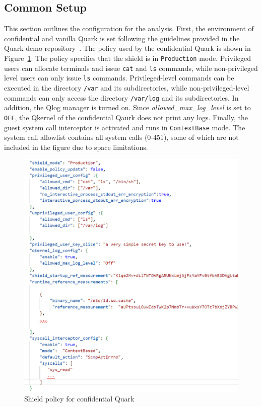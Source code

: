 \subsection{Common Setup}
\label{sec:eva_qualitativ_setup}

This section outlines the configuration for the analysis. First, the environment of confidential and vanilla Quark is set following the guidelines provided in the Quark demo repository~\cite*{Qaurk_Demo_for_qualitativ}. The policy used by the confidential Quark is shown in Figure~\ref{fig:generic_policy}. 
The policy specifies that the shield is in \texttt{Production} mode. Privileged users can allocate terminals and issue \texttt{cat} and \texttt{ls} commands, while non-privileged level users can only issue \texttt{ls} commands. Privileged-level commands can be executed in the directory 
\texttt{/var} and its subdirectories, while non-privileged-level commands can only access the directory \texttt{/var/log} and its subdirectories. In addition, the Qlog manager is turned on. Since \emph{allowed\_max\_log\_level} is set to \texttt{OFF}, the Qkernel of the confidential Qaurk does 
not print any logs. Finally, the guest system call interceptor is activated and runs in \texttt{ContextBase} mode. The system call allowlist contains all system calls (0-451), some of which are not included in the figure due to space limitations.


\begin{figure}[!htb]
  \centering
  \includegraphics[height=0.3\textheight]{images/generic_policy.PNG}
  \caption[Shield policy for confidential Quark]{Shield policy for confidential Quark}
  \label{fig:generic_policy}
\end{figure}


